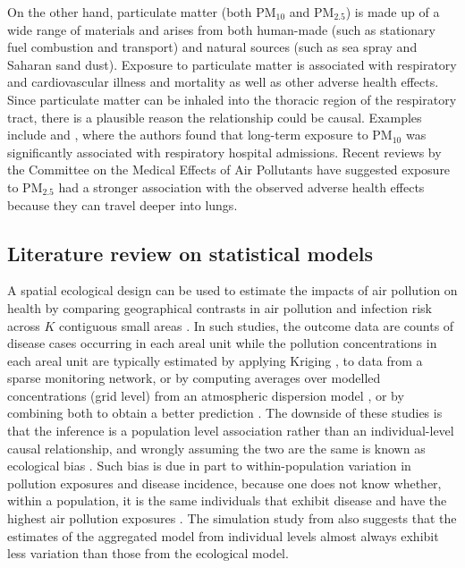 \documentclass[12,]{article}
\begin{document}
On the other hand, particulate matter (both PM\(_{10}\) and
PM\(_{2.5}\)) is made up of a wide range of materials and arises from
both human-made (such as stationary fuel combustion and transport) and
natural sources (such as sea spray and Saharan sand dust). Exposure to
particulate matter is associated with respiratory and cardiovascular
illness and mortality as well as other adverse health effects. Since
particulate matter can be inhaled into the thoracic region of the
respiratory tract, there is a plausible reason the relationship could be
causal. Examples include \textcite{Lee2009} and \textcite{Lee2012b},
where the authors found that long-term exposure to PM\(_{10}\) was
significantly associated with respiratory hospital admissions. Recent
reviews by the Committee on the Medical Effects of Air Pollutants
\autocite{COMEAP2010} have suggested exposure to PM\(_{2.5}\) had a
stronger association with the observed adverse health effects because
they can travel deeper into lungs.

\hypertarget{literature-review-on-statistical-models}{%
\subsection{Literature review on statistical
models}\label{literature-review-on-statistical-models}}

A spatial ecological design can be used to estimate the impacts of air
pollution on health by comparing geographical contrasts in air pollution
and infection risk across \(K\) contiguous small areas
\autocites{Huang2018}{Napier2018}{Rushworth2014}. In such studies, the
outcome data are counts of disease cases occurring in each areal unit
while the pollution concentrations in each areal unit are typically
estimated by applying Kriging \autocite[see][]{Diggle2007}, to data from
a sparse monitoring network, or by computing averages over modelled
concentrations (grid level) from an atmospheric dispersion model
\autocites{Wu2020}{Maheswaran2006}{Lee2009}{Warren2012a}, or by
combining both to obtain a better prediction
\autocites{Huang2018}{VinikoorImler2014}{Sacks2014}. The downside of
these studies is that the inference is a population level association
rather than an individual-level causal relationship, and wrongly
assuming the two are the same is known as ecological bias
\autocites{Arbia1988}{Wakefield2001}. Such bias is due in part to
within-population variation in pollution exposures and disease
incidence, because one does not know whether, within a population, it is
the same individuals that exhibit disease and have the highest air
pollution exposures \autocite{Lee2020}. The simulation study from
\textcite{Lee2020} also suggests that the estimates of the aggregated
model from individual levels almost always exhibit less variation than
those from the ecological model.
\end{document}
